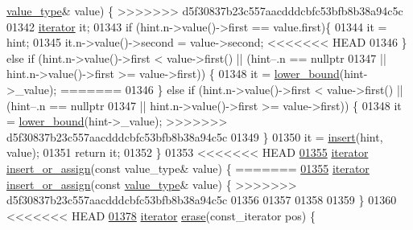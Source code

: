 \begin{DoxyCode}
      \hyperlink{classaed2_1_1map_a719db98e0ff9a837610f76be33264680_a719db98e0ff9a837610f76be33264680}{value\_type}& value) \{
>>>>>>> d5f30837b23c557aacdddcbfc53bfb8b38a94c5c
01342         \hyperlink{classaed2_1_1iterator}{iterator} it;
01343         \textcolor{keywordflow}{if} (hint.n->value()->first == value.first)\{
01344             it = hint;
01345             it.n->value()->second = value->second;
<<<<<<< HEAD
01346             \} \textcolor{keywordflow}{else} \textcolor{keywordflow}{if} (hint.n->value()->first < value->first() || (hint--.n == \textcolor{keyword}{
      nullptr}
01347             || hint.n->value()->first >= value->first)) \{
01348             it = \hyperlink{classaed2_1_1map_a3399d36fdd5a880b494f3a5795d3f18f_a3399d36fdd5a880b494f3a5795d3f18f}{lower_bound}(hint->\_value);
=======
01346             \} \textcolor{keywordflow}{else} \textcolor{keywordflow}{if} (hint.n->value()->first < value->first() || (hint--.n == \textcolor{keyword}{nullptr}
01347             || hint.n->value()->first >= value->first)) \{
01348             it = \hyperlink{classaed2_1_1map_a62075a47afdf89267c5462f88164af3d_a62075a47afdf89267c5462f88164af3d}{lower\_bound}(hint->\_value);
>>>>>>> d5f30837b23c557aacdddcbfc53bfb8b38a94c5c
01349         \}
01350         it = \hyperlink{classaed2_1_1map_a60aacba06b1579630b3c8e996cf248c8_a60aacba06b1579630b3c8e996cf248c8}{insert}(hint, value);
01351         \textcolor{keywordflow}{return} it;
01352     \}
01353 
<<<<<<< HEAD
\hypertarget{map2_8h_source_l01355}{}\hyperlink{classaed2_1_1map_a9128a806713bcc999ebd8a97ab77e765_a9128a806713bcc999ebd8a97ab77e765}{01355}     \hyperlink{classaed2_1_1iterator}{iterator} \hyperlink{classaed2_1_1map_a9128a806713bcc999ebd8a97ab77e765_a9128a806713bcc999ebd8a97ab77e765}{insert_or_assign}(\textcolor{keyword}{const} value\_type& value) \{
=======
\hyperlink{classaed2_1_1map_a9128a806713bcc999ebd8a97ab77e765_a9128a806713bcc999ebd8a97ab77e765}{01355}     \hyperlink{classaed2_1_1iterator}{iterator} \hyperlink{classaed2_1_1map_a9128a806713bcc999ebd8a97ab77e765_a9128a806713bcc999ebd8a97ab77e765}{insert\_or\_assign}(\textcolor{keyword}{const} \hyperlink{classaed2_1_1map_a719db98e0ff9a837610f76be33264680_a719db98e0ff9a837610f76be33264680}{value\_type}& value) \{
>>>>>>> d5f30837b23c557aacdddcbfc53bfb8b38a94c5c
01356 
01357 
01358         
01359     \}
01360 
<<<<<<< HEAD
\hypertarget{map2_8h_source_l01378}{}\hyperlink{classaed2_1_1map_ad8e796bf9c9c558e5ce6b61e116253fe_ad8e796bf9c9c558e5ce6b61e116253fe}{01378}     \hyperlink{classaed2_1_1iterator}{iterator} \hyperlink{classaed2_1_1map_ad8e796bf9c9c558e5ce6b61e116253fe_ad8e796bf9c9c558e5ce6b61e116253fe}{erase}(const\_iterator pos) \{

\end{DoxyCode}
